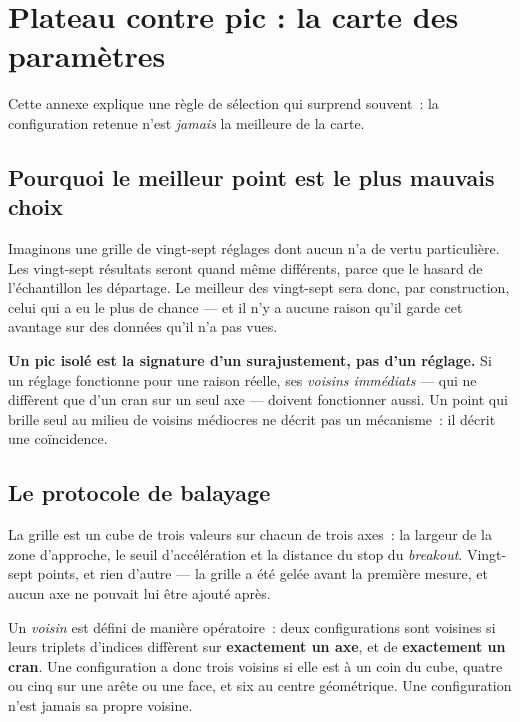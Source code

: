 \section{Plateau contre pic : la carte des paramètres}
\label{app:x10_plateau}

Cette annexe explique une règle de sélection qui surprend souvent~: la
configuration retenue n'est \emph{jamais} la meilleure de la carte.

\subsection{Pourquoi le meilleur point est le plus mauvais choix}

Imaginons une grille de vingt-sept réglages dont aucun n'a de vertu
particulière. Les vingt-sept résultats seront quand même différents, parce que
le hasard de l'échantillon les départage. Le meilleur des vingt-sept sera
donc, par construction, celui qui a eu le plus de chance --- et il n'y a
aucune raison qu'il garde cet avantage sur des données qu'il n'a pas vues.

\begin{insightbox}
\textbf{Un pic isolé est la signature d'un surajustement, pas d'un réglage.}
Si un réglage fonctionne pour une raison réelle, ses \emph{voisins immédiats}
--- qui ne diffèrent que d'un cran sur un seul axe --- doivent fonctionner
aussi. Un point qui brille seul au milieu de voisins médiocres ne décrit pas
un mécanisme~: il décrit une coïncidence.
\end{insightbox}

\subsection{Le protocole de balayage}

La grille est un cube de trois valeurs sur chacun de trois axes~: la largeur
de la zone d'approche, le seuil d'accélération et la distance du stop du
\emph{breakout}. Vingt-sept points, et rien d'autre --- la grille a été gelée
avant la première mesure, et aucun axe ne pouvait lui être ajouté après.

Un \emph{voisin} est défini de manière opératoire~: deux configurations sont
voisines si leurs triplets d'indices diffèrent sur \textbf{exactement un axe},
et de \textbf{exactement un cran}. Une configuration a donc trois voisins si
elle est à un coin du cube, quatre ou cinq sur une arête ou une face, et six
au centre géométrique. Une configuration n'est jamais sa propre voisine.

